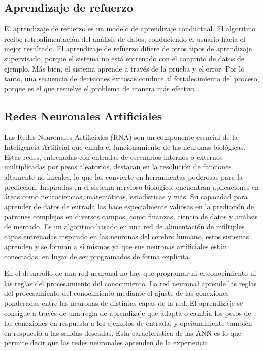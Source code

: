 \subsection{Aprendizaje de refuerzo}

El aprendizaje de refuerzo es un modelo de aprendizaje conductual. El algoritmo
recibe retroalimentación del análisis de datos, conduciendo el usuario hacia el
mejor resultado. El aprendizaje de refuerzo difiere de otros tipos de
aprendizaje supervisado, porque el sistema no está entrenado con el conjunto de
datos de ejemplo. Más bien, el sistema aprende a través de la prueba y el
error. Por lo tanto, una secuencia de decisiones exitosas conduce al
fortalecimiento del proceso, porque es el que resuelve el problema de manera
más efectiva \cite{ibm}.

\subsection{Redes Neuronales Artificiales}
Las Redes Neuronales Artificiales (RNA) son un componente esencial de la
Inteligencia Artificial que emula el funcionamiento de las neuronas biológicas.
Estas redes, entrenadas con entradas de escenarios internos o externos
multiplicadas por pesos aleatorios, destacan en la resolución de funciones
altamente no lineales, lo que las convierte en herramientas poderosas para la
predicción. Inspiradas en el sistema nervioso biológico, encuentran
aplicaciones en áreas como neurociencias, matemáticas, estadísticas y más. Su
capacidad para aprender de datos de entrada las hace especialmente valiosas en
la predicción de patrones complejos en diversos campos, como finanzas, ciencia
de datos y análisis de mercado. Es un algoritmo basado en una red de alimentación de múltiples capas entrenadas
inspirado en las neuronas del cerebro humano, estos sistemas aprenden y se
forman a sí mismos ya que sus neuronas artificiales están conectadas, en lugar
de ser programados de forma explícita\cite{herrera2020prediccion }.

\vspace{1\baselineskip}
En el desarrollo de una red neuronal no hay que programar ni el conocimiento ni las reglas del procesamiento del conocimiento. La red neuronal aprende las reglas del procesamiento del conocimiento mediante el ajuste de las conexiones ponderadas entre las neuronas de distintas capas de la red.
El aprendizaje se consigue a través de una regla de aprendizaje que adapta o cambia los pesos de las conexiones en respuesta a los ejemplos de entrada, y opcionalmente también en respuesta a las salidas deseadas. Esta característica de las ANN es lo que permite decir que las redes neuronales aprenden de la experiencia\cite{olabe1998redes}.

